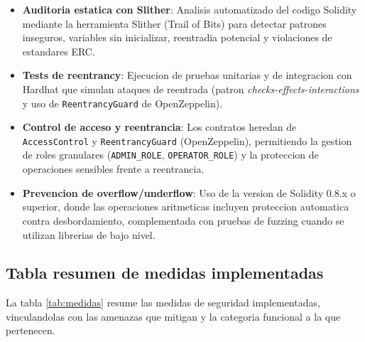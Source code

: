 \documentclass[11pt, a4paper]{article}
\begin{document}
\begin{itemize}
    \item \textbf{Auditoria estatica con Slither}: Analisis automatizado del codigo Solidity mediante la herramienta Slither (Trail of Bits) para detectar patrones inseguros, variables sin inicializar, reentradia potencial y violaciones de estandares ERC.
    \item \textbf{Tests de reentrancy}: Ejecucion de pruebas unitarias y de integracion con Hardhat que simulan ataques de reentrada (patron \textit{checks-effects-interactions} y uso de \texttt{ReentrancyGuard} de OpenZeppelin).
    \item \textbf{Control de acceso y reentrancia}: Los contratos heredan de \texttt{AccessControl} y \texttt{ReentrancyGuard} (OpenZeppelin), permitiendo la gestion de roles granulares (\texttt{ADMIN\_ROLE}, \texttt{OPERATOR\_ROLE}) y la proteccion de operaciones sensibles frente a reentrancia.
    \item \textbf{Prevencion de overflow/underflow}: Uso de la version de Solidity 0.8.x o superior, donde las operaciones aritmeticas incluyen proteccion automatica contra desbordamiento, complementada con pruebas de fuzzing cuando se utilizan librerias de bajo nivel.
\end{itemize}

\subsection{Tabla resumen de medidas implementadas}

La tabla \ref{tab:medidas} resume las medidas de seguridad implementadas, vinculandolas con las amenazas que mitigan y la categoria funcional a la que pertenecen.
\end{document}
